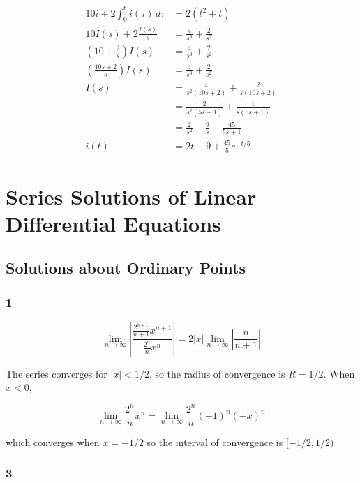 \documentclass{article}
\begin{document}
\begin{align*}
  10 i + 2 \int_0^t i(\tau) \,d\tau      & = 2 (t^2 + t)                                       \\
  10 I(s) + 2 \frac{I(s)}{s}             & = \frac{4}{s^3} + \frac{2}{s^2}                     \\
  \left( 10 + \frac{2}{s} \right) I(s)   & = \frac{4}{s^3} + \frac{2}{s^2}                     \\
  \left( \frac{10 s + 2}{s} \right) I(s) & = \frac{4}{s^3} + \frac{2}{s^2}                     \\
  I(s)                                   & = \frac{4}{s^2 (10 s + 2)} + \frac{2}{s (10 s + 2)} \\
                                         & = \frac{2}{s^2 (5 s + 1)} + \frac{1}{s (5 s + 1)}   \\
                                         & = \frac{2}{s^2} - \frac{9}{s} + \frac{45}{5 s + 1}  \\
  i(t)                                   & = 2 t - 9 + \frac{45}{5} e^{-t / 5}
\end{align*}

\section{Series Solutions of Linear Differential Equations}

\subsection{Solutions about Ordinary Points}

\subsubsection{1}

\[\lim_{n \rightarrow \infty} \left| \frac{\frac{2^{n + 1}}{n + 1} x^{n + 1}}{\frac{2^n}{n} x^n} \right| = 2 |x| \lim_{n \rightarrow \infty} \left| \frac{n}{n + 1} \right|\]

The series converges for $|x| < 1 / 2$, so the radius of convergence is $R = 1 / 2$. When $x < 0$,

\[\lim_{n \rightarrow \infty} \frac{2^n}{n} x^n = \lim_{n \rightarrow \infty} \frac{2^n}{n} (-1)^n (-x)^n\]

which converges when $x = -1 / 2$ so the interval of convergence is $[-1 / 2, 1 / 2)$

\subsubsection{3}
\end{document}
